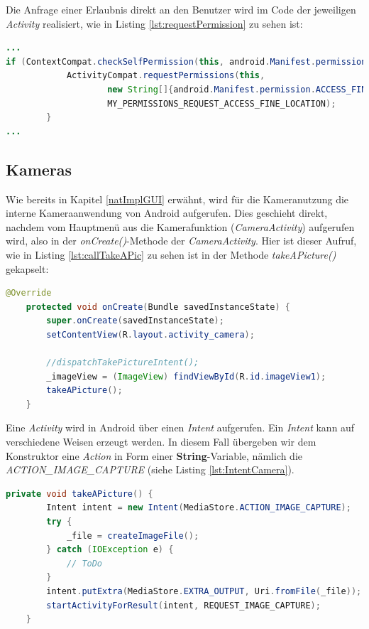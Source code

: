 Die Anfrage einer Erlaubnis direkt an den Benutzer wird im Code der jeweiligen \textit{Activity} realisiert, wie in Listing \ref{lst:requestPermission} zu sehen ist:
\clearpage

\begin{lstlisting}[caption=Generierung der Anfrage für die Erlaubnis einen Dienst zu nutzen an den Benutzer, label=lst:requestPermission, language=Java]
...
if (ContextCompat.checkSelfPermission(this, android.Manifest.permission.ACCESS_FINE_LOCATION) != PackageManager.PERMISSION_GRANTED) {
            ActivityCompat.requestPermissions(this,
                    new String[]{android.Manifest.permission.ACCESS_FINE_LOCATION},
                    MY_PERMISSIONS_REQUEST_ACCESS_FINE_LOCATION);
        }
...
\end{lstlisting} 

\subsection*{Kameras}

Wie bereits in Kapitel \ref{natImplGUI} erwähnt, wird für die Kameranutzung die interne Kameraanwendung von Android aufgerufen. Dies geschieht direkt, nachdem vom Hauptmenü aus die Kamerafunktion (\textit{CameraActivity}) aufgerufen wird, also in der \textit{onCreate()}-Methode der \textit{CameraActivity}. Hier ist dieser Aufruf, wie in Listing \ref{lst:callTakeAPic} zu sehen ist in der Methode \textit{takeAPicture()} gekapselt:

\begin{lstlisting}[caption=Aufruf der Android-Kamerafunktion in der \textit{onCreate()}-Methode der Klasse \textit{CameraActivity}, label=lst:callTakeAPic, language=Java]
@Override
    protected void onCreate(Bundle savedInstanceState) {
        super.onCreate(savedInstanceState);
        setContentView(R.layout.activity_camera);

        //dispatchTakePictureIntent();
        _imageView = (ImageView) findViewById(R.id.imageView1);
        takeAPicture();
    }
\end{lstlisting}  

Eine \textit{Activity} wird in Android über einen \textit{Intent} aufgerufen. Ein \textit{Intent} kann auf verschiedene Weisen erzeugt werden. In diesem Fall übergeben wir dem Konstruktor eine \textit{Action} in Form einer \textbf{String}-Variable, nämlich die \textit{ACTION\_IMAGE\_CAPTURE} (siehe Listing \ref{lst:IntentCamera}).
\clearpage

\begin{lstlisting}[caption=Methode \textit{takeAPicture()}: Aufruf der Android-Kamerafunktion über einen \textit{Intent}, label=lst:IntentCamera, language=Java]
private void takeAPicture() {
        Intent intent = new Intent(MediaStore.ACTION_IMAGE_CAPTURE);
        try {
            _file = createImageFile();
        } catch (IOException e) {
            // ToDo
        }
        intent.putExtra(MediaStore.EXTRA_OUTPUT, Uri.fromFile(_file));
        startActivityForResult(intent, REQUEST_IMAGE_CAPTURE);
    }
\end{lstlisting}  

